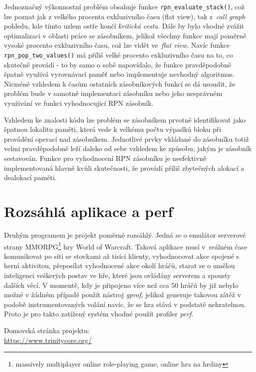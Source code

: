 \documentclass[czech,BP]{thesiskiv}
\begin{document}
Jednoznačný výkonnostní problém obsahuje funkce \texttt{rpn\_evaluate\_stack()}, což lze poznat jak z velkého procenta exkluzivního času (flat view), tak z~\emph{call graph} pohledu, kde tímto uzlem ostře končí \emph{kritická cesta}. Dále by bylo vhodné zvážit optimalizaci v oblasti práce se zásobníkem, jelikož všechny funkce mají poměrně vysoké procento exkluzivního času, což lze vidět ve~\emph{flat view}. Navíc funkce \texttt{rpn\_pop\_two\_values()} má příliš velké procento exkluzivního času na to, co skutečně provádí - to by samo o sobě napovídalo, že funkce pravděpodobně špatně využívá vyrovnávací paměť nebo implementuje nevhodný algoritmus. Nicméně vzhledem k časům ostatních zásobníkových funkcí se dá usoudit, že problém bude v samotné implementaci zásobníku nebo jeho nesprávném využívání ve funkci vyhodnocující RPN zásobník.

Vzhledem ke znalosti kódu lze problém se zásobníkem prvotně identifikovat jako špatnou lokalitu paměti, která vede k velkému počtu výpadků bloku při provádění operací nad zásobníkem. Jednotlivé prvky vkládané do zásobníku totiž velmi pravděpodobně leží daleko od sebe vzhledem ke způsobu, jakým je zásobník sestavován. Funkce pro vyhodnocení RPN zásobníku je neefektivně implementovaná hlavně kvůli skutečnosti, že provádí příliš zbytečných alokací a dealokací paměti.


\section{Rozsáhlá aplikace a perf}\label{sec:overeni2}

Druhým programem je projekt poměrně rozsáhlý. Jedná se o emulátor serverové strany MMORPG\footnote{massively multiplayer online role-playing game, online hra na hrdiny} hry World of Warcraft. Taková aplikace musí v~reálném čase komunikovat po síti se stovkami až tisíci klienty, vyhodnocovat akce spojené s herní aktivitou, přeposílat vyhodnocené akce okolí hráčů, starat se o umělou inteligenci veškerých postav ve hře, které jsou ovládány serverem a spousty dalších věcí. V momentě, kdy je připojeno více než cca 50 hráčů by již nebylo možné v žádném případě použít nástroj \emph{gprof}, jelikož generuje takovou zátěž v podobě instrumentovaných volání navíc, že se hra stává v podstatě nehratelnou. Proto je pro takto zatížený systém vhodné použít profiler \emph{perf}.

Domovská stránka projektu:\\
\url{https://www.trinitycore.org/}
\end{document}
